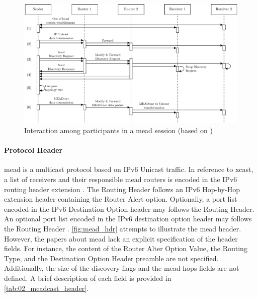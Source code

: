 \begin{figure}
    \centering
    \includegraphics[width=.95\textwidth]{img/mead_seq_dia.pdf}
    \caption[Interaction among participants in a MEADcast session]{
        Interaction among participants in a \gls{mead} session (based on \cite{meadcast2})}
    \label{fig:mead_seq_dia}
\end{figure}

\paragraph{Protocol Header} %
\label{par:Protocol Header}
\gls{mead} is a multicast protocol based on IPv6 Unicast traffic.
In reference to \gls{xcast}, a list of receivers and their responsible
    \gls{mead} routers is encoded in the IPv6 routing header extension
    \cite{meadcast2}.
The Routing Header follows an IPv6 Hop-by-Hop extension header containing the
    Router Alert option\cite{meadcast2}.
Optionally, a port list encoded in the IPv6 Destination Option header may
    follows the Routing Header.
An optional port list encoded in the IPv6 destination option header may follows
    the Routing Header \cite{meadcast2}.
\autoref{fig:mead_hdr} attempts to illustrate the \gls{mead} header.
However, the papers about \gls{mead} \cite{meadcast1, meadcast2} lack an
    explicit specification of the header fields.
For instance, the content of the Router Alter Option Value, the Routing Type,
    and the Destination Option Header preamble are not specified.
Additionally, the size of the discovery flags and the \gls{mead} hops fields
    are not defined.
A brief description of each field is provided in
\autoref{tab:02_meadcast_header}.

